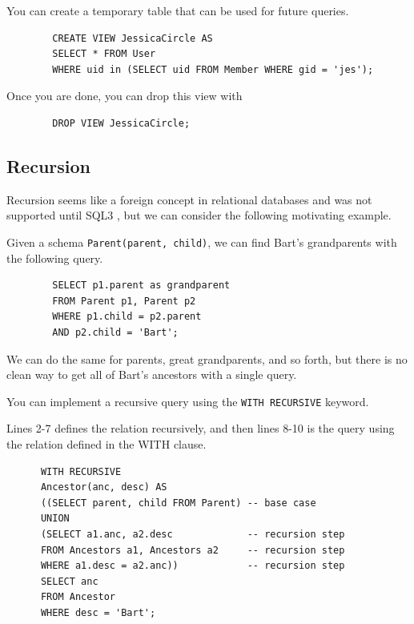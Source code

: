    \begin{example}
      You can create a temporary table that can be used for future queries. 
      \begin{lstlisting}
        CREATE VIEW JessicaCircle AS 
        SELECT * FROM User 
        WHERE uid in (SELECT uid FROM Member WHERE gid = 'jes'); 
      \end{lstlisting}
      Once you are done, you can drop this view with 
      \begin{lstlisting}
        DROP VIEW JessicaCircle; 
      \end{lstlisting}
    \end{example}

\subsection{Recursion} 

  Recursion seems like a foreign concept in relational databases and was not supported until SQL3 , but we can consider the following motivating example. 

  \begin{example}[Ancestors]
    Given a schema \texttt{Parent(parent, child)}, we can find Bart's grandparents with the following query. 
      \begin{lstlisting}
        SELECT p1.parent as grandparent 
        FROM Parent p1, Parent p2 
        WHERE p1.child = p2.parent 
        AND p2.child = 'Bart';
      \end{lstlisting}
      We can do the same for parents, great grandparents, and so forth, but there is no clean way to get all of Bart's ancestors with a single query.  
  \end{example} 

  \begin{definition}[Recursion]
    You can implement a recursive query using the \texttt{WITH RECURSIVE} keyword. 
  \end{definition}

  \begin{example}
    Lines 2-7 defines the relation recursively, and then lines 8-10 is the query using the relation defined in the WITH clause. 
    \begin{lstlisting}
      WITH RECURSIVE 
      Ancestor(anc, desc) AS 
      ((SELECT parent, child FROM Parent) -- base case
      UNION 
      (SELECT a1.anc, a2.desc             -- recursion step
      FROM Ancestors a1, Ancestors a2     -- recursion step
      WHERE a1.desc = a2.anc))            -- recursion step
      SELECT anc 
      FROM Ancestor 
      WHERE desc = 'Bart'; 
    \end{lstlisting}
  \end{example}

